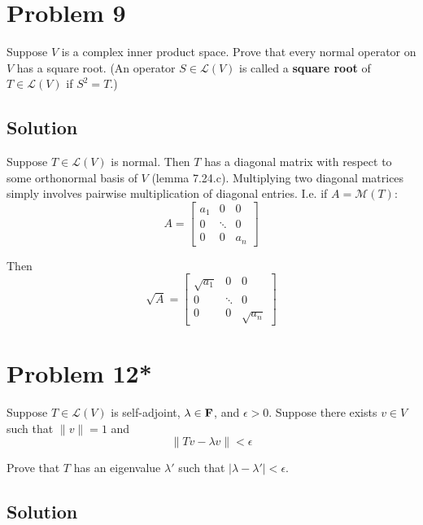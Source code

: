 \documentclass{article}
\begin{document}
\section*{Problem 9}
Suppose $V$ is a complex inner product space. Prove that every normal operator on $V$ has a square root. (An operator $S\in\mathcal{L}(V)$ is called a \textbf{square root} of $T\in\mathcal{L}(V)$ if $S^2=T$.)

\subsection*{Solution}
Suppose $T\in\mathcal{L}(V)$ is normal. Then $T$ has a diagonal matrix with respect to some orthonormal basis of $V$ (lemma 7.24.c). Multiplying two diagonal matrices simply involves pairwise multiplication of diagonal entries. I.e. if $A=\mathcal{M}(T)$:
\[A=\begin{bmatrix}
a_1 & 0 & 0 \\
0 & \ddots & 0 \\
0 & 0 & a_n
\end{bmatrix}
\]

Then
\[\sqrt{A}=\begin{bmatrix}
\sqrt{a_1} & 0 & 0 \\
0 & \ddots & 0 \\
0 & 0 & \sqrt{a_n}
\end{bmatrix}
\]

\section*{Problem 12*}
Suppose $T\in\mathcal{L}(V)$ is self-adjoint, $\lambda\in\mathbf{F}$, and $\epsilon>0$. Suppose there exists $v\in V$ such that $\|v\|=1$ and
\[\|Tv-\lambda v\|<\epsilon\]

Prove that $T$ has an eigenvalue $\lambda'$ such that $|\lambda-\lambda'|<\epsilon$.

\subsection*{Solution}
\end{document}

